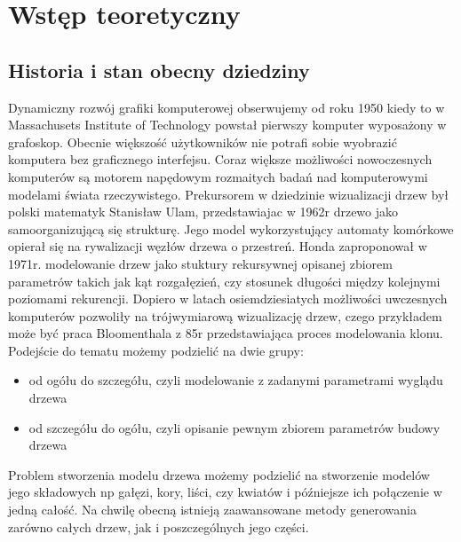 \chapter{Wstęp teoretyczny}



\section{Historia i stan obecny dziedziny}
Dynamiczny rozwój grafiki komputerowej obserwujemy od roku 1950 kiedy to w Massachusets Institute of Technology \cite{jankowski} powstał pierwszy
komputer wyposażony w grafoskop. Obecnie większość użytkowników nie potrafi sobie wyobrazić komputera bez graficznego interfejsu.
Coraz większe możliwości nowoczesnych komputerów są motorem napędowym rozmaitych badań nad komputerowymi modelami świata rzeczywistego.
Prekursorem w dziedzinie wizualizacji drzew był polski matematyk Stanisław Ulam, przedstawiajac w 1962r\cite{ulam} drzewo jako samoorganizującą się
strukturę. Jego model wykorzystujący automaty komórkowe opierał się na rywalizacji węzłów  drzewa o przestreń.
Honda zaproponował w 1971r. modelowanie drzew jako stuktury rekursywnej opisanej
zbiorem parametrów takich jak kąt rozgałęzień, czy stosunek długości między kolejnymi poziomami rekurencji\cite{honda}. Dopiero w latach osiemdziesiatych
możliwości uwczesnych komputerów pozwoliły na trójwymiarową wizualizację drzew, czego przykładem może być praca Bloomenthala z 85r \cite{bloomenthal}
przedstawiająca proces modelowania klonu. Podejście do tematu możemy podzielić na dwie grupy:
\begin{itemize}
\item od ogółu do szczegółu, czyli modelowanie z zadanymi parametrami wyglądu drzewa
\item od szczegółu do ogółu, czyli opisanie pewnym zbiorem parametrów budowy drzewa
\end{itemize}
Problem stworzenia modelu drzewa możemy podzielić na stworzenie modelów jego składowych np gałęzi, kory, liści, czy kwiatów i późniejsze
ich połączenie w jedną całość. Na chwilę obecną istnieją zaawansowane metody generowania zarówno całych drzew, jak i poszczególnych jego części.

